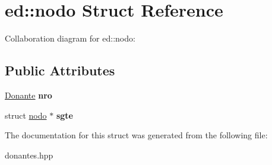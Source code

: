 \hypertarget{structed_1_1nodo}{}\section{ed\+:\+:nodo Struct Reference}
\label{structed_1_1nodo}


Collaboration diagram for ed\+:\+:nodo\+:
\subsection*{Public Attributes}
\begin{DoxyCompactItemize}
\item 
\hypertarget{structed_1_1nodo_aa2ce998c02db65d17edcd73430d0c822}{}\hyperlink{classed_1_1Donante}{Donante} {\bfseries nro}\label{structed_1_1nodo_aa2ce998c02db65d17edcd73430d0c822}

\item 
\hypertarget{structed_1_1nodo_a898db78f9e5691a3458a63a5b29d7452}{}struct \hyperlink{structed_1_1nodo}{nodo} $\ast$ {\bfseries sgte}\label{structed_1_1nodo_a898db78f9e5691a3458a63a5b29d7452}

\end{DoxyCompactItemize}


The documentation for this struct was generated from the following file\+:\begin{DoxyCompactItemize}
\item 
donantes.\+hpp\end{DoxyCompactItemize}
